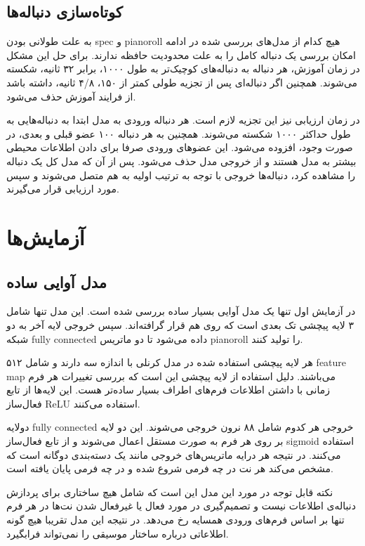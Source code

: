 \subsection{کوتاه‌سازی دنباله‌ها}
به علت طولانی بودن \gls{spec} و \gls{pianoroll} هیچ کدام از مدل‌های بررسی شده در
ادامه امکان بررسی یک دنباله کامل را به علت محدودیت حافظه ندارند. برای حل این
مشکل در زمان آموزش، هر دنباله به دنباله‌های کوچیک‌تر به طول ۱۰۰۰، برابر ۳۲
ثانیه، شکسته می‌شوند. همچنین اگر دنباله‌ای پس از تجزیه طولی کمتر از ۱۵۰، ۴/۸
ثانیه، داشته باشد از فرایند آموزش حذف می‌شود.

در زمان ارزیابی نیز این تجزیه لازم است. هر دنباله ورودی به مدل ابتدا به
دنباله‌هایی به طول حداکثر ۱۰۰۰ شکسته می‌شوند. همچنین به هر دنباله ۱۰۰ عضو قبلی و
بعدی، در صورت وجود، افزوده می‌شود. این عضوهای ورودی صرفا برای دادن اطلاعات محیطی
بیشتر به مدل هستند و از خروجی مدل حذف می‌شود. پس از آن که مدل کل یک دنباله را
مشاهده کرد، دنباله‌ها خروجی با توجه به ترتیب اولیه به هم متصل می‌شوند و سپس مورد
ارزیابی قرار می‌گیرند.

\section{آزمایش‌ها}
\subsection{مدل آوایی ساده}
در آزمایش اول تنها یک مدل آوایی بسیار ساده بررسی شده است. این مدل تنها شامل ۳
لایه پیچشی تک بعدی است که روی هم قرار گرافته‌اند. سپس خروجی لایه آخر به دو شبکه
\gls{fully connected} داده می‌شود تا دو ماتریس \gls{pianoroll} را تولید کنند.

هر لایه پیچشی استفاده شده در مدل کرنلی با اندازه سه دارند و شامل ۵۱۲
\gls{feature map} می‌باشند. دلیل استفاده از لایه پیچشی این است که بررسی تغییرات
هر فرم زمانی با داشتن اطلاعات فرم‌های اطراف بسیار ساده‌تر هست. این لایه‌ها از
تابع فعال‌ساز ReLU استفاده می‌کنند.

دولایه \gls{fully connected} خروجی هر کدوم شامل ۸۸ نرون خروجی می‌شوند. این دو
لایه بر روی هر فرم به صورت مستقل اعمال می‌شوند و از تابع فعال‌ساز sigmoid
استفاده می‌کنند. در نتیجه هر درایه ماتریس‌های خروجی مانند یک دسته‌بندی دوگانه
است که مشخص می‌کند هر نت در چه فرمی شروع شده و در چه فرمی پایان یافته است.

نکته قابل توجه در مورد این مدل این است که شامل هیچ ساختاری برای پردازش دنباله‌ی
اطلاعات نیست و تصمیم‌گیری در مورد فعال یا غیرفعال شدن نت‌ها در هر فرم تنها
بر اساس فرم‌های ورودی همسایه رخ می‌دهد. در نتیجه این مدل تقریبا هیچ گونه
اطلاعاتی درباره ساختار موسیقی را نمی‌تواند فرابگیرد.

